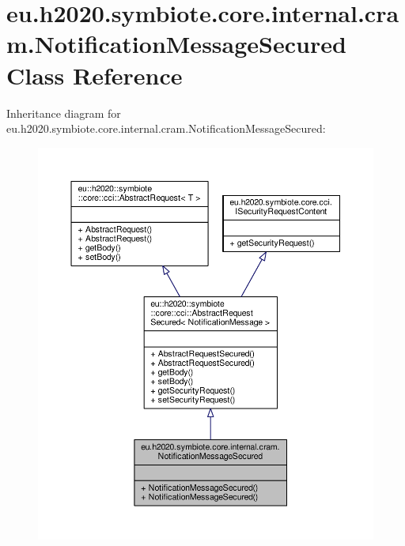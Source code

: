 \hypertarget{classeu_1_1h2020_1_1symbiote_1_1core_1_1internal_1_1cram_1_1NotificationMessageSecured}{}\section{eu.\+h2020.\+symbiote.\+core.\+internal.\+cram.\+Notification\+Message\+Secured Class Reference}
\label{classeu_1_1h2020_1_1symbiote_1_1core_1_1internal_1_1cram_1_1NotificationMessageSecured}


Inheritance diagram for eu.\+h2020.\+symbiote.\+core.\+internal.\+cram.\+Notification\+Message\+Secured\+:
\nopagebreak
\begin{figure}[H]
\begin{center}
\leavevmode
\includegraphics[width=350pt]{classeu_1_1h2020_1_1symbiote_1_1core_1_1internal_1_1cram_1_1NotificationMessageSecured__inherit__graph}
\end{center}
\end{figure}


